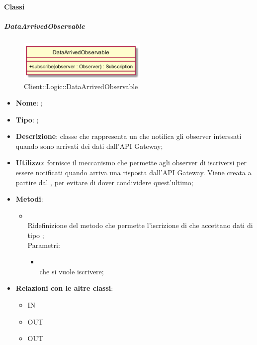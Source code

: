 \paragraph{Classi}
\hypertarget{DataArrivedObservable_label}{\subparagraph{DataArrivedObservable}}
\begin{figure}[h]
	\centering
	\includegraphics[width=0.55\textwidth,height=\textheight,keepaspectratio]{images/ClassDataArrivedObservable.png}
	\caption{Client::Logic::DataArrivedObservable}
\end{figure}
\begin{itemize}
	\item \textbf{Nome}: ;
	\item \textbf{Tipo}: ;
	\item \textbf{Descrizione}: classe che rappresenta un  che notifica gli observer interssati quando sono arrivati dei dati dall'API Gateway;
	\item \textbf{Utilizzo}: fornisce il meccanismo che permette agli observer di iscriversi per essere notificati quando arriva una risposta dall'API Gateway. Viene creata a partire dal , per evitare di dover condividere quest'ultimo;
	\item \textbf{Metodi}:
	\begin{itemize}
		\item[]  \\		Ridefinizione del metodo che permette l'iscrizione di  che accettano dati di tipo ;\\
		Parametri:
		\begin{itemize}
			\item {} \\
			 che si vuole iscrivere;
		\end{itemize}
	\end{itemize}
	\item \textbf{Relazioni con le altre classi}:
	\begin{itemize}
		\item IN \hyperlink{Logic_label}{}
		\item OUT \hyperlink{ApplicationManagerObserver_label}{}
		\item OUT \hyperlink{PlayerObserver_label}{}
	\end{itemize}
\end{itemize}
\FloatBarrier

